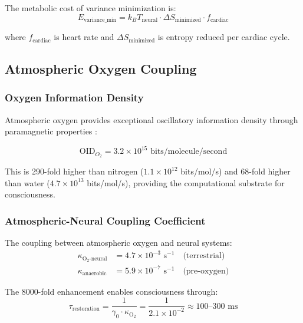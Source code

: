 \documentclass[12pt,twocolumn]{article}
\theoremstyle{remark}
\begin{document}
The metabolic cost of variance minimization is:
\begin{equation}
E_{\text{variance\_min}} = k_B T_{\text{neural}} \cdot \Delta S_{\text{minimized}} \cdot f_{\text{cardiac}}
\end{equation}

where $f_{\text{cardiac}}$ is heart rate and $\Delta S_{\text{minimized}}$ is entropy reduced per cardiac cycle.

\subsection{Atmospheric Oxygen Coupling}

\subsubsection{Oxygen Information Density}

Atmospheric oxygen provides exceptional oscillatory information density through paramagnetic properties \citep{sachikonye2024atmospheric}:

\begin{equation}
\text{OID}_{O_2} = 3.2 \times 10^{15} \text{ bits/molecule/second}
\end{equation}

This is 290-fold higher than nitrogen ($1.1 \times 10^{12}$ bits/mol/s) and 68-fold higher than water ($4.7 \times 10^{13}$ bits/mol/s), providing the computational substrate for consciousness.

\subsubsection{Atmospheric-Neural Coupling Coefficient}

The coupling between atmospheric oxygen and neural systems:
\begin{align}
\kappa_{\text{O}_2\text{-neural}} &= 4.7 \times 10^{-3} \text{ s}^{-1} \quad \text{(terrestrial)} \\
\kappa_{\text{anaerobic}} &= 5.9 \times 10^{-7} \text{ s}^{-1} \quad \text{(pre-oxygen)}
\end{align}

The 8000-fold enhancement enables consciousness through:
\begin{equation}
\tau_{\text{restoration}} = \frac{1}{\gamma_0 \cdot \kappa_{\text{O}_2}} = \frac{1}{2.1 \times 10^{-2}} \approx 100\text{--}300 \text{ ms}
\end{equation}
\end{document}
